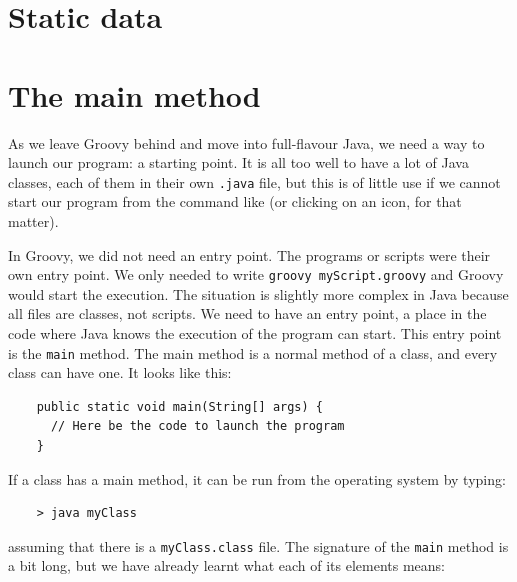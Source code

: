 
\section{Static data}
\label{sec:static-data}



\section{The main method}
\label{sec:main-method}

As we leave Groovy behind and move into full-flavour Java, we need a
way to launch our program: a starting point. It is all too well to
have a lot of Java classes, each of them in their own \verb+.java+
file, but this is of little use if we cannot start our program from
the command like (or clicking on an icon, for that matter). 

In Groovy, we did not need an entry point. The programs or scripts
were their own entry point. We only needed to 
write \verb+groovy myScript.groovy+ and Groovy would
start the execution. The situation is slightly more complex in Java
because all files are classes, not scripts. We need to have an entry
point, a place in the code where Java knows the execution of the
program can start. This entry point is the \verb+main+ method. The
main method is a normal method of a class, and every class can have
one. It looks like this: 

\begin{verbatim}
    public static void main(String[] args) {
      // Here be the code to launch the program
    }
\end{verbatim}

If a class has a main method, it can be run from the operating system
by typing: 

\begin{verbatim}
    > java myClass
\end{verbatim}

assuming that there is a \verb+myClass.class+ file. The 
signature of the \verb+main+ method is a bit long, but we have
already learnt what each of its elements means: 

